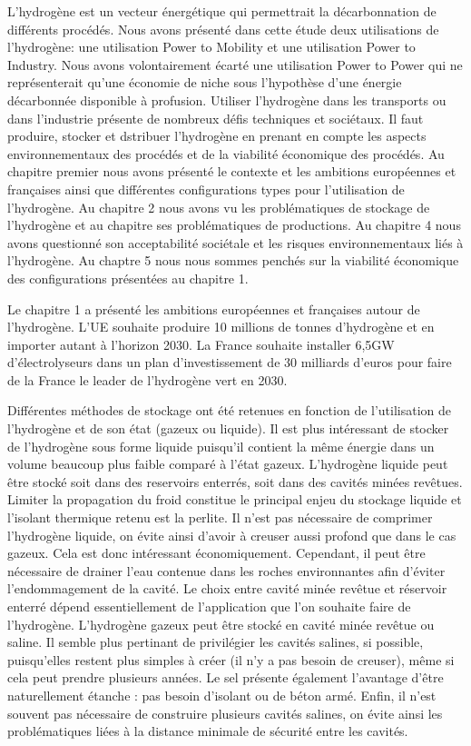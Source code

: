 \documentclass[11pt,french,a4paper]{article}
\begin{document}
L'hydrogène est un vecteur énergétique qui permettrait la décarbonnation de différents procédés. Nous avons présenté dans cette étude deux utilisations de l'hydrogène: une utilisation Power to Mobility
et une utilisation Power to Industry. Nous avons volontairement écarté une utilisation Power to Power qui ne représenterait qu'une économie de niche sous l'hypothèse d'une énergie décarbonnée disponible à profusion. Utiliser l'hydrogène dans les transports ou dans l'industrie présente de nombreux défis techniques et sociétaux. 
Il faut produire, stocker et dstribuer l'hydrogène en prenant en compte les aspects environnementaux des procédés et de la viabilité économique des procédés. Au chapitre premier nous avons présenté le contexte et les ambitions européennes et françaises ainsi que différentes configurations types pour l'utilisation de l'hydrogène. Au chapitre 2 nous avons vu les problématiques de stockage de l'hydrogène et au chapitre ses problématiques de productions. Au chapitre 4 nous avons questionné son acceptabilité sociétale et les risques environnementaux liés à l'hydrogène. Au chaptre 5 nous nous sommes penchés sur la viabilité économique des configurations présentées au chapitre 1.

Le chapitre 1 a présenté les ambitions européennes et françaises autour de l'hydrogène. L'UE souhaite produire 10 millions de tonnes d'hydrogène et en importer autant à l'horizon 2030. La France souhaite installer 6,5GW d'électrolyseurs dans un plan d'investissement de 30 milliards d'euros pour faire de la France le leader de l'hydrogène vert en 2030.


Différentes méthodes de stockage  ont été retenues en fonction de l'utilisation de l'hydrogène et de son état (gazeux ou liquide). 
Il est plus intéressant de stocker de l'hydrogène sous forme liquide puisqu'il contient la même énergie dans un volume beaucoup plus faible comparé à l'état gazeux. 
L'hydrogène liquide peut être stocké soit dans des reservoirs enterrés, soit dans des cavités minées revêtues. Limiter la propagation du froid constitue le principal enjeu du stockage liquide et l'isolant thermique retenu est la perlite. Il n'est pas nécessaire  de comprimer l'hydrogène liquide, on évite ainsi d'avoir à creuser aussi profond que dans le cas gazeux. Cela est donc intéressant économiquement. Cependant, il peut être nécessaire de drainer l'eau contenue dans les roches environnantes afin d'éviter l'endommagement de la cavité. Le choix entre cavité minée revêtue et réservoir enterré dépend essentiellement de l'application que l'on souhaite faire de l'hydrogène.
L'hydrogène gazeux peut être stocké en cavité minée revêtue ou saline. Il semble plus pertinant de privilégier les cavités salines, si possible, puisqu'elles restent plus simples à créer (il n'y a pas besoin de creuser), même si cela peut prendre plusieurs années. Le sel présente également l'avantage d'être naturellement étanche : pas besoin d'isolant ou de béton armé. Enfin, il n'est souvent pas nécessaire de construire plusieurs cavités salines, on évite ainsi les problématiques liées à la distance minimale de sécurité entre les cavités.
\end{document}
